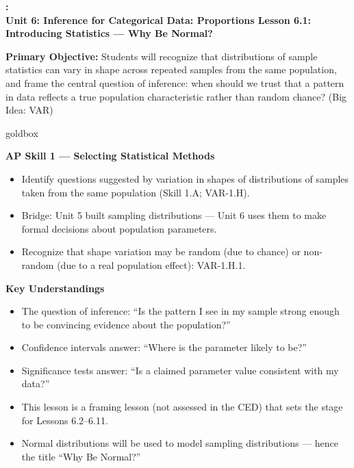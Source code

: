 \documentclass[10pt]{article}
\newcommand{\UnitNumberName}{Unit 6: Inference for Categorical Data: Proportions \quad}
\newcommand{\LessonNumberName}{Lesson 6.1: Introducing Statistics --- Why Be Normal?}
\begin{document}
\begin{center}
    {\Large\bfseries \CourseName: \SchoolYear \\
    {\small\bfseries \UnitNumberName \LessonNumberName}}
\end{center}

\begin{tcolorbox}[colback=sky, colframe=navy, boxrule=0.9pt, arc=2mm,
    left=2mm, right=2mm, top=1.5mm, bottom=1.5mm]
    \textbf{Primary Objective:} Students will recognize that distributions of sample statistics
    can vary in shape across repeated samples from the same population, and frame the central
    question of inference: when should we trust that a pattern in data reflects a true population
    characteristic rather than random chance? (Big Idea: VAR)
\end{tcolorbox}

\renewcommand{\arraystretch}{1.6}
\begin{skillbox}{goldbox}
\begin{minipage}[t]{0.48\linewidth}
    \textbf{AP Skill 1 --- Selecting Statistical Methods}
    \begin{itemize}
        \item Identify questions suggested by variation in shapes of distributions
              of samples taken from the same population (Skill 1.A; VAR-1.H).
        \item Bridge: Unit 5 built sampling distributions --- Unit 6 uses them to
              make formal decisions about population parameters.
        \item Recognize that shape variation may be random (due to chance) or
              non-random (due to a real population effect): VAR-1.H.1.
    \end{itemize}
\end{minipage}
\hfill
\begin{minipage}[t]{0.48\linewidth}
    \textbf{Key Understandings}
    \begin{itemize}
        \item The question of inference: ``Is the pattern I see in my sample strong
              enough to be convincing evidence about the population?''
        \item Confidence intervals answer: ``Where is the parameter likely to be?''
        \item Significance tests answer: ``Is a claimed parameter value consistent
              with my data?''
        \item This lesson is a framing lesson (not assessed in the CED) that sets
              the stage for Lessons 6.2--6.11.
        \item Normal distributions will be used to model sampling distributions ---
              hence the title ``Why Be Normal?''
    \end{itemize}
\end{minipage}
\end{skillbox}
\end{document}
